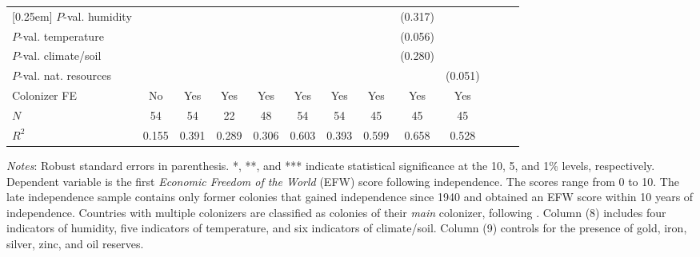 \begin{sidewaystable}[h!]
\begin{threeparttable}
\begin{center}
\begin{minipage}{\textwidth}
\begin{tabular*}{\textwidth}{@{\extracolsep{\fill}}lcccccccccccc@{\extracolsep{\fill}}}
[0.25em]
$P$-val. humidity &&&&&&&& (0.317) & \\
$P$-val. temperature &&&&&&&& (0.056) & \\
$P$-val. climate/soil &&&&&&&& (0.280) & \\
$P$-val. nat. resources &&&&&&&&   & (0.051)\\
[0.5em]
Colonizer FE & No & Yes & Yes& Yes& Yes& Yes& Yes& Yes& Yes\\
\hline
\(N\)       &          54         &          54         &          22         &          48         &          54         &          54         &          45         &          45         &          45         \\
\(R^{2}\)   &       0.155         &       0.391         &       0.289         &       0.306         &       0.603         &       0.393         &       0.599         &       0.658         &       0.528         \\
\hline\hline
\end{tabular*}
\begin{tablenotes}
\small
\item \textit{Notes}: Robust standard errors in parenthesis. *, **, and *** indicate statistical significance at the 10, 5, and 1\% levels, respectively. Dependent variable is the first \textit{Economic Freedom of the World} (EFW) score following independence. The scores range from 0 to 10. The late independence sample contains only former colonies that gained independence since 1940 and obtained an EFW score within 10 years of independence. Countries with multiple colonizers are classified as colonies of their \textit{main} colonizer, following \cite{laporta1999quality}. Column (8) includes four indicators of humidity, five indicators of temperature, and six indicators of climate/soil. Column (9) controls for the presence of gold, iron, silver, zinc, and oil reserves. 
\end{tablenotes}
\end{minipage}
\end{center}
\end{threeparttable}
\end{sidewaystable}

